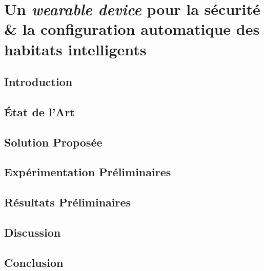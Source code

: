 \chapter{Un \textit{wearable device} pour la sécurité \& la configuration automatique des habitats intelligents}
\label{chap:5}

\section{Introduction}

\section{État de l'Art}

\section{Solution Proposée}

\section{Expérimentation Préliminaires}

\section{Résultats Préliminaires}

\section{Discussion}

\section{Conclusion}
